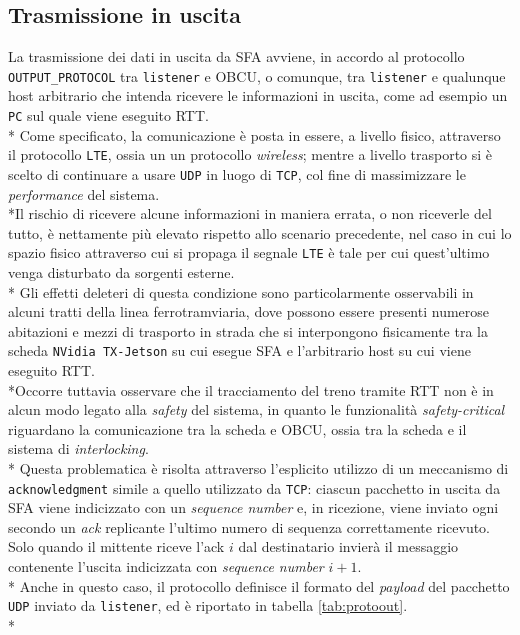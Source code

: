 \subsection{Trasmissione in uscita}
La trasmissione dei dati in uscita da SFA avviene, in accordo al protocollo \texttt{OUTPUT\_PROTOCOL} tra \texttt{listener} e OBCU, o comunque, tra \texttt{listener} e qualunque host arbitrario che intenda ricevere le informazioni in uscita, come ad esempio un \texttt{PC} sul quale viene eseguito RTT.\\*
Come specificato, la comunicazione \`e posta in essere, a livello fisico, attraverso il protocollo \texttt{LTE}, ossia un un protocollo \emph{wireless}; mentre a livello trasporto si \`e scelto di continuare a usare \texttt{UDP} in luogo di \texttt{TCP}, col fine di massimizzare le \emph{performance} del sistema.\\*Il rischio di ricevere alcune informazioni in maniera errata, o non riceverle del tutto, \`e nettamente pi\`u elevato rispetto allo scenario precedente, nel caso in cui lo spazio fisico attraverso cui si propaga il segnale \texttt{LTE} \`e tale per cui quest'ultimo venga disturbato da sorgenti esterne.\\* Gli effetti deleteri di questa condizione sono particolarmente osservabili in alcuni tratti della linea ferrotramviaria, dove possono essere presenti numerose abitazioni e mezzi di trasporto in strada che si interpongono fisicamente tra la scheda \texttt{NVidia TX-Jetson} su cui esegue SFA e l'arbitrario host su cui viene eseguito RTT.\\*Occorre tuttavia osservare che il tracciamento del treno tramite RTT non \`e in alcun modo legato alla \emph{safety} del sistema, in quanto le funzionalit\`a \emph{safety-critical} riguardano la comunicazione tra la scheda e OBCU, ossia tra la scheda e il sistema di \emph{interlocking}.\\*
Questa problematica \`e risolta attraverso l'esplicito utilizzo di un meccanismo di \texttt{acknowledgment} simile a quello utilizzato da \texttt{TCP}: ciascun pacchetto in uscita da SFA viene indicizzato con un \emph{sequence number} e, in ricezione, viene inviato ogni secondo un \emph{ack} replicante l'ultimo numero di sequenza correttamente ricevuto. Solo quando il mittente riceve l'ack $i$ dal destinatario invier\`a il messaggio contenente l'uscita indicizzata con \emph{sequence number} $i+1$.\\*
Anche in questo caso, il protocollo definisce il formato del \emph{payload} del pacchetto \texttt{UDP} inviato da \texttt{listener}, ed \`e riportato in tabella \ref{tab:protoout}.\\*\newpage
